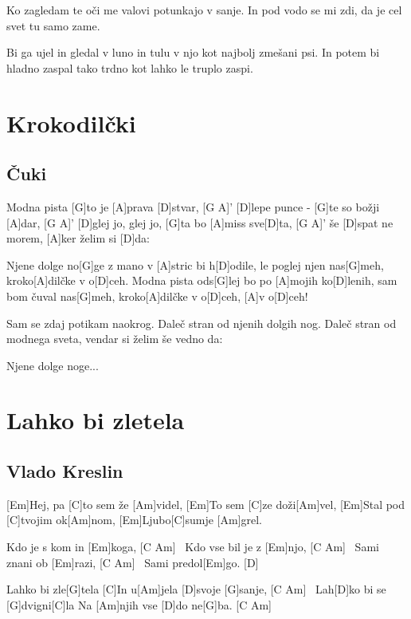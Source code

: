 \documentclass[a4paper,12pt]{article}
\begin{document}
\begin{multicols}{2}
\begin{guitar}
Ko zagledam te oči 
me valovi potunkajo v sanje.
In pod vodo se mi zdi,
da je cel svet tu samo zame.


Bi ga ujel in gledal v luno 
in tulu v njo kot najbolj zmešani psi.
In potem bi hladno zaspal 
tako trdno kot lahko le truplo zaspi.

\end{guitar}
\section{Krokodilčki}
\subsection*{Čuki}
\begin{guitar}
[D]Modna pista [G]to je [A]prava [D]stvar, [G A]'
[D]lepe punce - [G]te so božji [A]dar, [G A]'
[D]glej jo, glej jo, [G]ta bo [A]miss sve[D]ta, [G A]'
še [D]spat ne morem, [A]ker želim si [D]da:


Njene dolge no[G]ge z mano v [A]stric bi h[D]odile,
le poglej njen nas[G]meh, kroko[A]dilčke v o[D]ceh.
Modna pista ods[G]lej bo po [A]mojih ko[D]lenih,
sam bom čuval nas[G]meh, kroko[A]dilčke v o[D]ceh,
[A]v o[D]ceh!


Sam se zdaj potikam naokrog.
Daleč stran od njenih dolgih nog.
Daleč stran od modnega sveta,
vendar si želim še vedno da:


Njene dolge noge...   

\end{guitar}
\section{Lahko bi zletela}
\subsection*{Vlado Kreslin}
\begin{guitar}
[prehod: C H G F#]

[Em]Hej, pa [C]to sem že [Am]videl,
[Em]To sem [C]ze doži[Am]vel, 
[Em]Stal pod [C]tvojim ok[Am]nom,
[Em]Ljubo[C]sumje [Am]grel.



Kdo je s kom in [Em]koga, [C Am] \
Kdo vse bil je z [Em]njo, [C Am] \
Sami znani ob [Em]razi, [C Am] \
Sami predol[Em]go. [D]



Lahko bi zle[G]tela
[C]In u[Am]jela [D]svoje [G]sanje, [C Am] \
Lah[D]ko bi se [G]dvigni[C]la
Na [Am]njih vse [D]do ne[G]ba. [C Am] \



\end{guitar}
\end{multicols}
\end{document}
